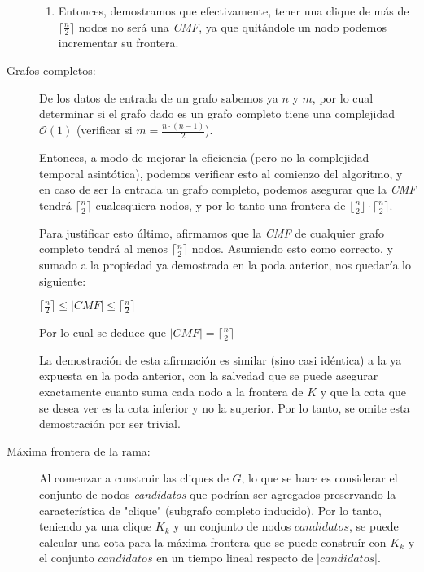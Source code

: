 \begin{description}
\begin{enumerate}
            \item Entonces, demostramos que efectivamente, tener una clique de m\'as de
                $\lceil\frac{n}{2}\rceil$ nodos no ser\'a una \emph{CMF}, ya que quit\'andole
                un nodo podemos incrementar su frontera.

        \end{enumerate}

    \item[Grafos completos: ] De los datos de entrada de un grafo sabemos ya $n$
        y $m$, por lo cual determinar si el grafo dado es un grafo completo tiene
        una complejidad $\mathcal O(1)$ (verificar si $m = \frac{n \cdot (n-1)}{2}$).

        \par Entonces, a modo de mejorar la eficiencia (pero no la complejidad temporal
            asint\'otica), podemos verificar esto al comienzo del algoritmo, y en caso
            de ser la entrada un grafo completo, podemos asegurar que la \emph{CMF} tendr\'a
            $\lceil\frac{n}{2}\rceil$ cualesquiera nodos, y por lo tanto una frontera de
            $\lfloor\frac{n}{2}\rfloor \cdot \lceil\frac{n}{2}\rceil$.

        \par Para justificar esto \'ultimo, afirmamos que la \emph{CMF} de cualquier grafo
            completo tendr\'a al menos $\lceil\frac{n}{2}\rceil$ nodos. Asumiendo esto como
            correcto, y sumado a la propiedad ya demostrada en la poda anterior, nos quedar\'ia
            lo siguiente:

        \bigskip\par $\lceil\frac{n}{2}\rceil \leq |CMF| \leq \lceil\frac{n}{2}\rceil$

        \bigskip\par Por lo cual se deduce que $|CMF| = \lceil\frac{n}{2}\rceil$

        \bigskip\par La demostraci\'on de esta afirmaci\'on es similar (sino casi id\'entica)
            a la ya expuesta en la poda anterior, con la salvedad que se puede asegurar
            exactamente cuanto suma cada nodo a la frontera de $K$ y que la cota que se
            desea ver es la cota inferior y no la superior. Por lo tanto, se omite esta
            demostraci\'on por ser trivial.

    \item[M\'axima frontera de la rama: ] Al comenzar a construir las cliques de $G$,
        lo que se hace es considerar el conjunto de nodos \emph{candidatos} que podr\'ian
        ser agregados preservando la caracter\'istica de "clique" (subgrafo completo
        inducido). Por lo tanto, teniendo ya una clique $K_k$ y un conjunto de nodos
        $candidatos$, se puede calcular una cota para la m\'axima frontera que
        se puede constru\'ir con $K_k$ y el conjunto $candidatos$ en un tiempo
        lineal respecto de $|candidatos|$.


\end{description}
